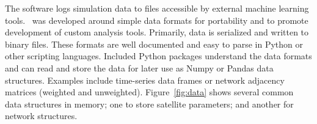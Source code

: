 \documentclass[conference]{IEEEtran}
\newcommand{\project}{{\sc{Collaborate}}~}
\begin{document}

The software logs simulation data to files accessible by external machine learning tools.  \project was developed around simple data formats for portability and to promote development of custom analysis tools.  Primarily, data is serialized and written to binary files.  These formats are well documented and easy to parse in Python or other scripting languages.  Included Python packages understand the data formats and can read and store the data for later use as Numpy or Pandas data structures.  Examples include time-series data frames or network adjacency matrices (weighted and unweighted).  Figure~\ref{fig:data} shows several common data structures in memory; one to store satellite parameters; and another for network structures.
\end{document}

